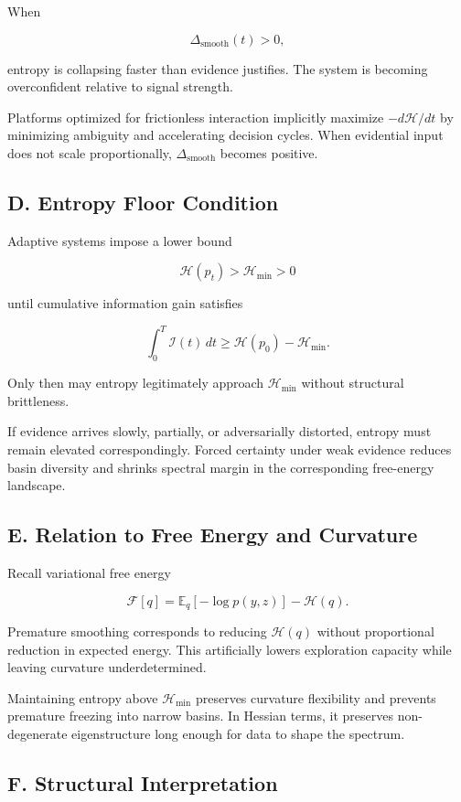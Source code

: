 \documentclass[11pt]{article}
\theoremstyle{remark}
\begin{document}
When

\[
\Delta_{\text{smooth}}(t) > 0,
\]

entropy is collapsing faster than evidence justifies. The system is becoming overconfident relative to signal strength.

Platforms optimized for frictionless interaction implicitly maximize $-d\mathcal{H}/dt$ by minimizing ambiguity and accelerating decision cycles. When evidential input does not scale proportionally, $\Delta_{\text{smooth}}$ becomes positive.

\subsection*{D. Entropy Floor Condition}

Adaptive systems impose a lower bound

\[
\mathcal{H}(p_t) > \mathcal{H}_{\min} > 0
\]

until cumulative information gain satisfies

\[
\int_0^T \mathcal{I}(t)\, dt
\ge
\mathcal{H}(p_0) - \mathcal{H}_{\min}.
\]

Only then may entropy legitimately approach $\mathcal{H}_{\min}$ without structural brittleness.

If evidence arrives slowly, partially, or adversarially distorted, entropy must remain elevated correspondingly. Forced certainty under weak evidence reduces basin diversity and shrinks spectral margin in the corresponding free-energy landscape.

\subsection*{E. Relation to Free Energy and Curvature}

Recall variational free energy

\[
\mathcal{F}[q]
=
\mathbb{E}_{q}[-\log p(y,z)]
-
\mathcal{H}(q).
\]

Premature smoothing corresponds to reducing $\mathcal{H}(q)$ without proportional reduction in expected energy. This artificially lowers exploration capacity while leaving curvature underdetermined.

Maintaining entropy above $\mathcal{H}_{\min}$ preserves curvature flexibility and prevents premature freezing into narrow basins. In Hessian terms, it preserves non-degenerate eigenstructure long enough for data to shape the spectrum.

\subsection*{F. Structural Interpretation}
\end{document}
